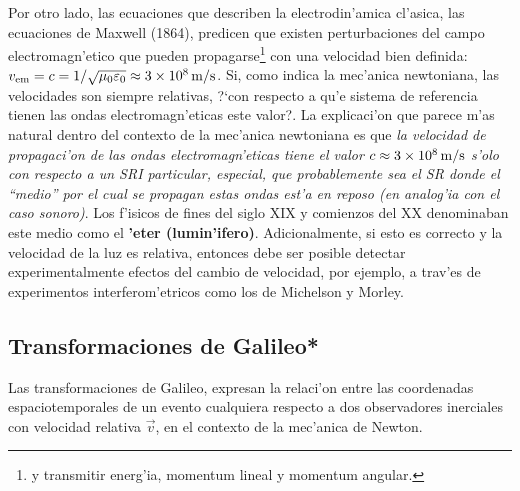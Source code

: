 Por otro lado, las ecuaciones que describen la electrodin'amica cl'asica,  las ecuaciones de Maxwell (1864), predicen que existen perturbaciones del campo electromagn'etico que pueden propagarse\footnote{y transmitir energ'ia, momentum lineal y momentum angular.} con una velocidad bien definida: $v_{\rm em}=c ={1}/{\sqrt{\mu_0\varepsilon_0}}\approx 3\times 10^{8}\,\rm m/s$. Si, como indica la mec'anica newtoniana, las velocidades son siempre relativas, ?`con respecto a qu'e sistema de referencia tienen las ondas electromagn'eticas este valor?. La explicaci'on que parece m'as natural dentro del contexto de la mec'anica newtoniana es que \textit{la velocidad de
propagaci'on de las ondas electromagn'eticas tiene el valor $c\approx 3\times 10^{8}\,\rm m/s$ s'olo con respecto a un SRI particular, especial, que probablemente sea el SR donde el ``medio'' por el cual se propagan estas ondas est'a en reposo (en analog'ia con el caso sonoro)}. Los f'isicos de fines del siglo XIX y comienzos del XX denominaban este medio como el \textbf{'eter  (lumin'ifero)}. Adicionalmente, si esto es correcto y la velocidad de la luz es relativa, entonces debe ser posible detectar experimentalmente efectos del cambio de velocidad, por ejemplo, a trav'es de experimentos interferom'etricos como los de Michelson y Morley.

\subsection{Transformaciones de Galileo*}
Las transformaciones de Galileo, expresan la relaci'on entre las coordenadas espaciotemporales de un evento cualquiera respecto a dos observadores inerciales con velocidad relativa $\vec{v}$, en el contexto de la mec'anica de Newton.

